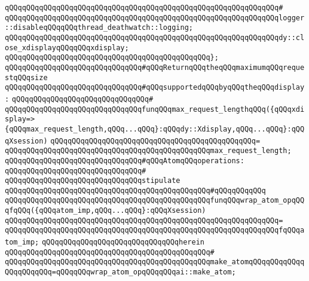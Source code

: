 \verb|qQQqqQQqqQQqqQQqqQQqqQQqqQQqqQQqqQQqqQQqqQQqqQQqqQQqqQQqqQQqqQQq#|\newline
\verb|qQQqqQQqqQQqqQQqqQQqqQQqqQQqqQQqqQQqqQQqqQQqqQQqqQQqqQQqqQQqqQQqlogger::disableqQQqqQQqthread_deathwatch::logging;|\newline
\newline
\verb|qQQqqQQqqQQqqQQqqQQqqQQqqQQqqQQqqQQqqQQqqQQqqQQqqQQqqQQqqQQqqQQqdy::close_xdisplayqQQqqQQqxdisplay;|\newline
\verb|qQQqqQQqqQQqqQQqqQQqqQQqqQQqqQQqqQQqqQQqqQQqqQQq};|\newline
\newline
\verb|qQQqqQQqqQQqqQQqqQQqqQQqqQQqqQQq#qQQqReturnqQQqtheqQQqmaximumqQQqrequestqQQqsize|\newline
\verb|qQQqqQQqqQQqqQQqqQQqqQQqqQQqqQQq#qQQqsupportedqQQqbyqQQqtheqQQqdisplay:|\newline
\verb|qQQqqQQqqQQqqQQqqQQqqQQqqQQqqQQq#|\newline
\verb|qQQqqQQqqQQqqQQqqQQqqQQqqQQqqQQqfunqQQqmax_request_lengthqQQq({qQQqxdisplay=>{qQQqmax_request_length,qQQq...qQQq}:qQQqdy::Xdisplay,qQQq...qQQq}:qQQqXsession)|\newline
\verb|qQQqqQQqqQQqqQQqqQQqqQQqqQQqqQQqqQQqqQQqqQQqqQQq=|\newline
\verb|qQQqqQQqqQQqqQQqqQQqqQQqqQQqqQQqqQQqqQQqqQQqqQQqmax_request_length;|\newline
\newline
\verb|qQQqqQQqqQQqqQQqqQQqqQQqqQQqqQQq#qQQqAtomqQQqoperations:|\newline
\verb|qQQqqQQqqQQqqQQqqQQqqQQqqQQqqQQq#|\newline
\verb|qQQqqQQqqQQqqQQqqQQqqQQqqQQqqQQqstipulate|\newline
\verb|qQQqqQQqqQQqqQQqqQQqqQQqqQQqqQQqqQQqqQQqqQQqqQQq#qQQqqQQqqQQq|\newline
\verb|qQQqqQQqqQQqqQQqqQQqqQQqqQQqqQQqqQQqqQQqqQQqqQQqfunqQQqwrap_atom_opqQQqfqQQq({qQQqatom_imp,qQQq...qQQq}:qQQqXsession)|\newline
\verb|qQQqqQQqqQQqqQQqqQQqqQQqqQQqqQQqqQQqqQQqqQQqqQQqqQQqqQQqqQQqqQQq=|\newline
\verb|qQQqqQQqqQQqqQQqqQQqqQQqqQQqqQQqqQQqqQQqqQQqqQQqqQQqqQQqqQQqqQQqfqQQqatom_imp;|\newline
\verb|qQQqqQQqqQQqqQQqqQQqqQQqqQQqqQQqherein|\newline
\verb|qQQqqQQqqQQqqQQqqQQqqQQqqQQqqQQqqQQqqQQqqQQqqQQq#|\newline
\verb|qQQqqQQqqQQqqQQqqQQqqQQqqQQqqQQqqQQqqQQqqQQqqQQqmake_atomqQQqqQQqqQQqqQQqqQQqqQQq=qQQqqQQqwrap_atom_opqQQqqQQqai::make_atom;|\newline
